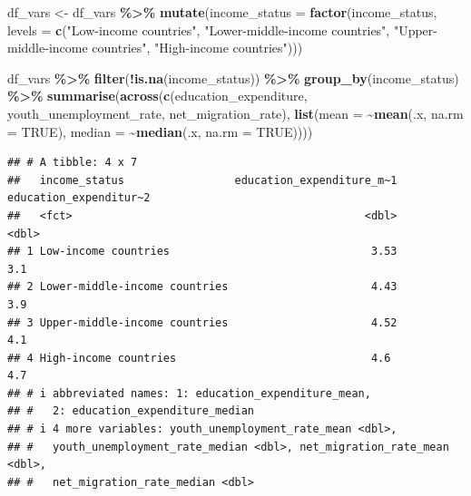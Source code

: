 \documentclass[
]{article}
\newenvironment{Shaded}{\begin{snugshade}}{\end{snugshade}}
\newcommand{\AttributeTok}[1]{\textcolor[rgb]{0.13,0.29,0.53}{#1}}
\newcommand{\ConstantTok}[1]{\textcolor[rgb]{0.56,0.35,0.01}{#1}}
\newcommand{\FunctionTok}[1]{\textcolor[rgb]{0.13,0.29,0.53}{\textbf{#1}}}
\newcommand{\NormalTok}[1]{#1}
\newcommand{\OtherTok}[1]{\textcolor[rgb]{0.56,0.35,0.01}{#1}}
\newcommand{\SpecialCharTok}[1]{\textcolor[rgb]{0.81,0.36,0.00}{\textbf{#1}}}
\newcommand{\StringTok}[1]{\textcolor[rgb]{0.31,0.60,0.02}{#1}}
\begin{document}
\begin{Shaded}
\begin{Highlighting}[]
\NormalTok{df\_vars }\OtherTok{\textless{}{-}}\NormalTok{ df\_vars }\SpecialCharTok{\%\textgreater{}\%}
  \FunctionTok{mutate}\NormalTok{(}\AttributeTok{income\_status =} \FunctionTok{factor}\NormalTok{(income\_status, }
                                \AttributeTok{levels =} \FunctionTok{c}\NormalTok{(}\StringTok{"Low{-}income countries"}\NormalTok{, }
                                           \StringTok{"Lower{-}middle{-}income countries"}\NormalTok{, }
                                           \StringTok{"Upper{-}middle{-}income countries"}\NormalTok{, }
                                           \StringTok{"High{-}income countries"}\NormalTok{)))}

\NormalTok{df\_vars }\SpecialCharTok{\%\textgreater{}\%}
  \FunctionTok{filter}\NormalTok{(}\SpecialCharTok{!}\FunctionTok{is.na}\NormalTok{(income\_status)) }\SpecialCharTok{\%\textgreater{}\%}
  \FunctionTok{group\_by}\NormalTok{(income\_status) }\SpecialCharTok{\%\textgreater{}\%}
  \FunctionTok{summarise}\NormalTok{(}\FunctionTok{across}\NormalTok{(}\FunctionTok{c}\NormalTok{(education\_expenditure, youth\_unemployment\_rate, net\_migration\_rate),}
                   \FunctionTok{list}\NormalTok{(}\AttributeTok{mean =} \SpecialCharTok{\textasciitilde{}}\FunctionTok{mean}\NormalTok{(.x, }\AttributeTok{na.rm =} \ConstantTok{TRUE}\NormalTok{), }
                        \AttributeTok{median =} \SpecialCharTok{\textasciitilde{}}\FunctionTok{median}\NormalTok{(.x, }\AttributeTok{na.rm =} \ConstantTok{TRUE}\NormalTok{))))}
\end{Highlighting}
\end{Shaded}

\begin{verbatim}
## # A tibble: 4 x 7
##   income_status                 education_expenditure_m~1 education_expenditur~2
##   <fct>                                             <dbl>                  <dbl>
## 1 Low-income countries                               3.53                    3.1
## 2 Lower-middle-income countries                      4.43                    3.9
## 3 Upper-middle-income countries                      4.52                    4.1
## 4 High-income countries                              4.6                     4.7
## # i abbreviated names: 1: education_expenditure_mean,
## #   2: education_expenditure_median
## # i 4 more variables: youth_unemployment_rate_mean <dbl>,
## #   youth_unemployment_rate_median <dbl>, net_migration_rate_mean <dbl>,
## #   net_migration_rate_median <dbl>
\end{verbatim}
\end{document}
